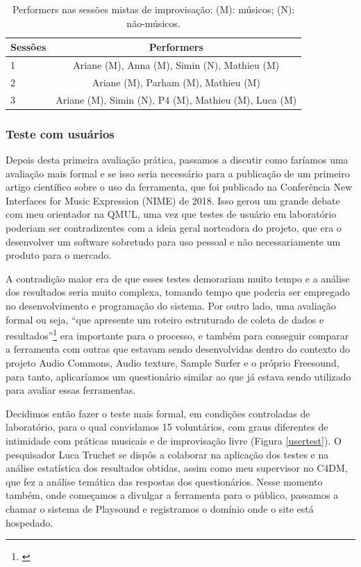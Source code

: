 \begin{table}

\caption{Performers nas sessões mistas de improvisação: (M): músicos; (N): não-músicos.}
\begin{tabular}{|lc|} \hline
Sessões & Performers \\ \hline
1 & Ariane (M), Anna (M), Simin (N), Mathieu (M)\\ \hline
2 & Ariane (M), Parham (M), Mathieu (M) \\ \hline
3 & Ariane (M), Simin (N), P4 (M), Mathieu (M), Luca (M)\\
\hline\end{tabular}
\label{tab:puppets}
\end{table}

\subsubsection{Teste com usuários}

Depois desta primeira avaliação prática, passamos a discutir como faríamos uma avaliação mais formal e se isso seria necessário para a publicação de um primeiro artigo científico sobre o uso da ferramenta, que foi publicado na Conferência New Interfaces for Music Expression (NIME) de 2018. Isso gerou um grande debate com meu orientador na QMUL, uma vez que testes de usuário em laboratório poderiam ser contradizentes com a ideia geral norteadora do projeto, que era o desenvolver um software sobretudo para uso pessoal e não necessariamente um produto para o mercado. 


A contradição maior era de que esses testes demorariam muito tempo e a análise dos resultados seria muito complexa, tomando tempo que poderia ser empregado no desenvolvimento e programação do sistema. Por outro lado, uma avaliação formal ou seja, ``que apresente um roteiro estruturado de coleta de dados e resultados''\footnote{\cite{Stowell}} era importante para o processo, e também para conseguir comparar a ferramenta com outras que estavam sendo desenvolvidas dentro do contexto do projeto Audio Commons, Audio texture, Sample Surfer e o próprio Freesound, para tanto, aplicaríamos um questionário similar ao que já estava sendo utilizado para avaliar essas ferramentas.


Decidimos então fazer o teste mais formal, em condições controladas de laboratório, para o qual convidamos 15 voluntários, com graus diferentes de intimidade com práticas musicais e de improvisação livre (Figura \ref{usertest}). O pesquisador Luca Truchet se dispôs a colaborar na aplicação dos testes e na análise estatística dos resultados obtidas, assim como meu supervisor no C4DM, que fez a análise temática das respostas dos questionários. Nesse momento também, onde começamos a divulgar a ferramenta para o público, passamos a chamar o sistema de Playsound e registramos o domínio onde o site está hospedado.


